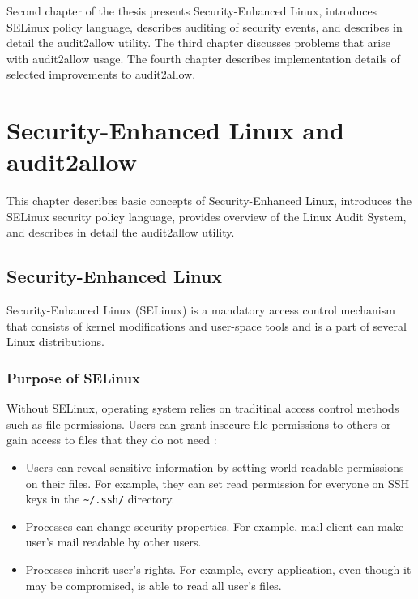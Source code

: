 Second chapter of the thesis presents Security-Enhanced Linux, introduces
SELinux policy language, describes auditing of security events, and describes
in detail the audit2allow utility. The third chapter discusses problems that
arise with audit2allow usage. The fourth chapter describes implementation
details of selected improvements to audit2allow.

\chapter{Security-Enhanced Linux and audit2allow}

This chapter describes basic concepts of Security-Enhanced Linux, introduces the
SELinux security policy language, provides overview of the Linux Audit System,
and describes in detail the audit2allow utility.

\section{Security-Enhanced Linux}
Security-Enhanced Linux (SELinux) is a mandatory access control mechanism that
consists of kernel modifications and user-space tools and is a part of several
Linux distributions.

\subsection{Purpose of SELinux}
Without SELinux, operating system relies on traditinal access control methods
such as file permissions. Users can grant insecure file permissions to others or
gain access to files that they do not need \cite{selinuxguide}:
\begin{itemize}
    \item Users can reveal sensitive information by setting world readable
        permissions on their files. For example, they can set read permission
        for everyone on SSH keys in the \texttt{\textasciitilde/.ssh/}
        directory.
    \item Processes can change security properties. For example, mail client can
        make user's mail readable by other users.
    \item Processes inherit user's rights. For example, every application, even
        though it may be compromised, is able to read all user's files.
\end{itemize}

